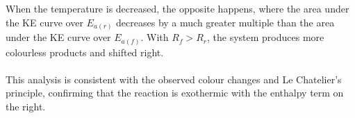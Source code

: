 When the temperature is decreased, the opposite happens, where the area under the KE curve over $E_{a(r)}$ decreases by a much greater multiple than the area under the KE curve over $E_{a(f)}$. With $R_f > R_r$, the system produces more colourless products and shifted right.
~
\\
~
\\
This analysis is consistent with the observed colour changes and Le Chatelier's principle, confirming that the reaction is exothermic with the enthalpy term on the right.
